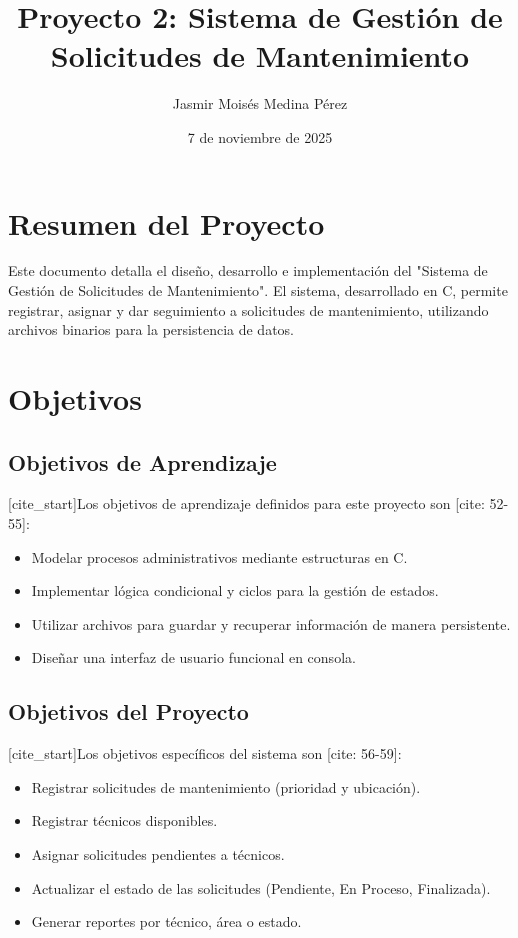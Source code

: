 \documentclass[12pt, letterpaper]{article}
\title{Proyecto 2: Sistema de Gestión de Solicitudes de Mantenimiento}
\author{Jasmir Moisés Medina Pérez}
\date{7 de noviembre de 2025}
\begin{document}
\section*{Resumen del Proyecto}
Este documento detalla el diseño, desarrollo e implementación del "Sistema de Gestión de Solicitudes de Mantenimiento". El sistema, desarrollado en C, permite registrar, asignar y dar seguimiento a solicitudes de mantenimiento, utilizando archivos binarios para la persistencia de datos.

\tableofcontents
\newpage

\section{Objetivos}
\subsection{Objetivos de Aprendizaje}
[cite_start]Los objetivos de aprendizaje definidos para este proyecto son [cite: 52-55]:
\begin{itemize}
    \item Modelar procesos administrativos mediante estructuras en C.
    \item Implementar lógica condicional y ciclos para la gestión de estados.
    \item Utilizar archivos para guardar y recuperar información de manera persistente.
    \item Diseñar una interfaz de usuario funcional en consola.
\end{itemize}

\subsection{Objetivos del Proyecto}
[cite_start]Los objetivos específicos del sistema son [cite: 56-59]:
\begin{itemize}
    \item Registrar solicitudes de mantenimiento (prioridad y ubicación).
    \item Registrar técnicos disponibles.
    \item Asignar solicitudes pendientes a técnicos.
    \item Actualizar el estado de las solicitudes (Pendiente, En Proceso, Finalizada).
    \item Generar reportes por técnico, área o estado.
\end{itemize}
\end{document}
